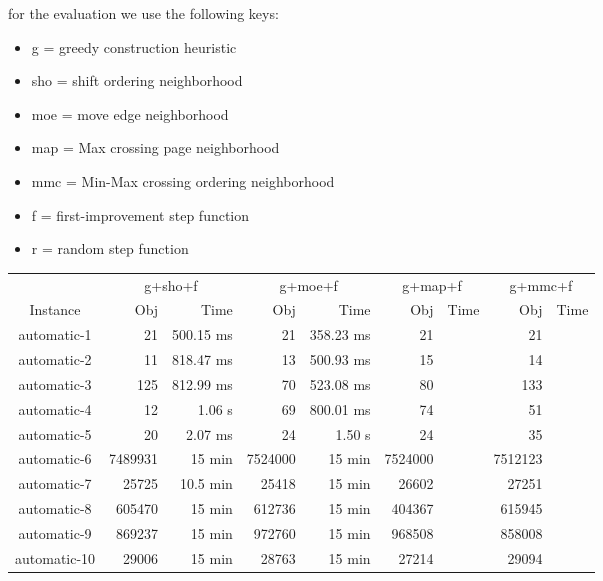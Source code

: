 \documentclass[11pt]{article}
\begin{document}
{
for the evaluation we use the following keys:
\begin{itemize}
	\item g = greedy construction heuristic
	\item sho = shift ordering neighborhood
	\item moe = move edge neighborhood
	\item map = Max crossing page neighborhood
	\item mmc = Min-Max crossing ordering neighborhood 
	\item f = first-improvement step function
	\item r = random step function
\end{itemize}
\center
\begin{tabular}{c|rr|rr|rr|rr}
	     & \multicolumn{2}{c}{g+sho+f} & \multicolumn{2}{c}{g+moe+f} & \multicolumn{2}{c}{g+map+f} & \multicolumn{2}{c}{g+mmc+f} \\
Instance     & Obj     & Time              & Obj          & Time         & Obj          & Time         & Obj        & Time            \\
\hline
automatic-1  & 21      & 500.15 ms         & 21           & 358.23 ms    &  21          &              & 21         &                 \\
automatic-2  & 11      & 818.47 ms         & 13           & 500.93 ms    &  15          &              & 14         &                 \\
automatic-3  & 125     & 812.99 ms         & 70           & 523.08 ms    &  80          &              & 133        &                 \\
automatic-4  & 12      & 1.06 s            & 69           & 800.01 ms    &  74          &              & 51         &                 \\
automatic-5  & 20      & 2.07 ms           & 24           & 1.50 s       &  24          &              & 35         &                 \\
automatic-6  & 7489931 & 15 min            & 7524000      & 15 min       &  7524000     &              & 7512123    &                 \\
automatic-7  & 25725   & 10.5 min          & 25418        & 15 min       &  26602       &              & 27251      &                 \\
automatic-8  & 605470  & 15 min            & 612736       & 15 min       &  404367      &              & 615945     &                 \\
automatic-9  & 869237  & 15 min            & 972760       & 15 min       &  968508      &              & 858008     &                 \\
automatic-10 & 29006   & 15 min            & 28763        & 15 min       &  27214       &              & 29094      &                 \\
\end{tabular}
}
\end{document}
